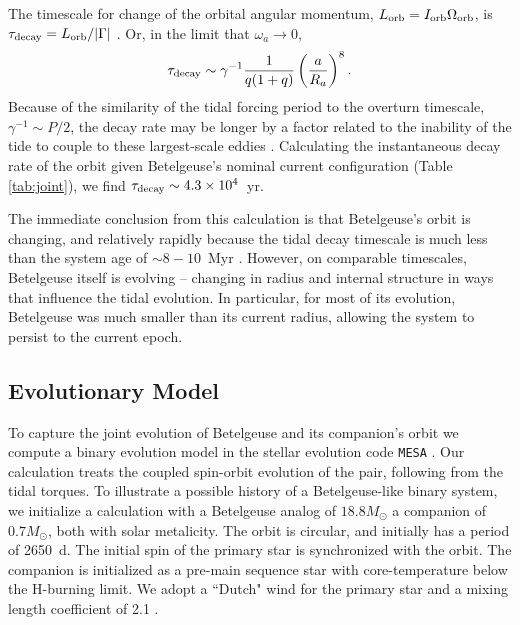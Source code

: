\documentclass[twocolumn]{aastex631}
\begin{document}
The timescale for change of the orbital angular momentum, $L_{\rm orb}=I_{\rm orb} \Omega_{\rm orb}$, is $\tau_{\rm decay} =   L_{\rm orb}/|\Gamma|$ \citep[e.g.][]{1996ApJ...470.1187R}. Or, in the limit that $\omega_a \rightarrow 0$, 
\begin{equation}
    \tau_{\rm decay} \sim \gamma^{-1} \frac{1}{ q (1+q) } \left( \frac{a}{R_a} \right)^8 . 
\end{equation}
Because of the similarity of the tidal forcing period to the overturn timescale, $\gamma^{-1} \sim P/2$, the decay rate may be longer by a factor related to the inability of the tide to couple to these largest-scale eddies \citep{1996ApJ...470.1187R,2008EAS....29...67Z,2014ARA&A..52..171O}.
Calculating the instantaneous decay rate of the orbit given Betelgeuse's nominal current configuration (Table \ref{tab:joint}), we find $\tau_{\rm decay} \sim 4.3\times 10^4$~yr. 

The immediate conclusion from this calculation is that Betelgeuse's orbit is changing, and relatively rapidly because the tidal decay timescale is much less than the system age of $\sim 8-10$~Myr \citep{2020ApJ...902...63J}. However, on comparable timescales, Betelgeuse itself is evolving -- changing in radius and internal structure in ways that influence the tidal evolution. In particular, for most of its evolution, Betelgeuse was much smaller than its current radius, allowing the system to persist to the current epoch. 

\subsection{Evolutionary Model}



To capture the joint evolution of Betelgeuse and its companion's orbit we compute a binary evolution model in the stellar evolution code {\tt MESA} \citep{2011ApJS..192....3P,2013ApJS..208....4P,2015ApJS..220...15P,2018ApJS..234...34P,2019ApJS..243...10P,2023ApJS..265...15J}. Our calculation treats the coupled spin-orbit evolution of the pair, following from the tidal torques. To illustrate a possible history of a Betelgeuse-like binary system, we initialize a calculation with a Betelgeuse analog of $18.8M_\odot$ a companion of $0.7M_\odot$, both with solar metalicity. The orbit is circular, and initially has a period of 2650~d. The initial spin of the primary star is synchronized with the orbit. The companion is initialized as a pre-main sequence star with core-temperature below the H-burning limit. We adopt a ``Dutch" wind for the primary star and a mixing length coefficient of 2.1 \citep[see, e.g.][ for a more detailed discussion of Betelgeuse-like models in MESA]{2020ApJ...902...63J}. 
\end{document}
